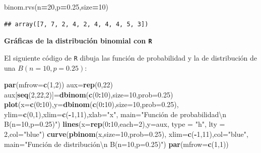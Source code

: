 \documentclass[]{book}
\newenvironment{Shaded}{\begin{snugshade}}{\end{snugshade}}
\newcommand{\CharTok}[1]{\textcolor[rgb]{0.31,0.60,0.02}{#1}}
\newcommand{\DataTypeTok}[1]{\textcolor[rgb]{0.13,0.29,0.53}{#1}}
\newcommand{\DecValTok}[1]{\textcolor[rgb]{0.00,0.00,0.81}{#1}}
\newcommand{\FloatTok}[1]{\textcolor[rgb]{0.00,0.00,0.81}{#1}}
\newcommand{\KeywordTok}[1]{\textcolor[rgb]{0.13,0.29,0.53}{\textbf{#1}}}
\newcommand{\NormalTok}[1]{#1}
\newcommand{\OperatorTok}[1]{\textcolor[rgb]{0.81,0.36,0.00}{\textbf{#1}}}
\newcommand{\StringTok}[1]{\textcolor[rgb]{0.31,0.60,0.02}{#1}}
\begin{document}
\begin{Shaded}
\begin{Highlighting}[]
\NormalTok{binom.rvs(n}\OperatorTok{=}\DecValTok{20}\NormalTok{,p}\OperatorTok{=}\FloatTok{0.25}\NormalTok{,size}\OperatorTok{=}\DecValTok{10}\NormalTok{)}
\end{Highlighting}
\end{Shaded}

\begin{verbatim}
## array([7, 7, 2, 4, 2, 4, 4, 4, 5, 3])
\end{verbatim}

\textbf{Gráficas de la distribución binomial con \texttt{R}}

El siguiente código de \texttt{R} dibuja las función de probabilidad y la de distribución de una \(B(n=10,p=0.25)\):

\begin{Shaded}
\begin{Highlighting}[]
\KeywordTok{par}\NormalTok{(}\DataTypeTok{mfrow=}\KeywordTok{c}\NormalTok{(}\DecValTok{1}\NormalTok{,}\DecValTok{2}\NormalTok{))}
\NormalTok{aux=}\KeywordTok{rep}\NormalTok{(}\DecValTok{0}\NormalTok{,}\DecValTok{22}\NormalTok{)}
\NormalTok{aux[}\KeywordTok{seq}\NormalTok{(}\DecValTok{2}\NormalTok{,}\DecValTok{22}\NormalTok{,}\DecValTok{2}\NormalTok{)]=}\KeywordTok{dbinom}\NormalTok{(}\KeywordTok{c}\NormalTok{(}\DecValTok{0}\OperatorTok{:}\DecValTok{10}\NormalTok{),}\DataTypeTok{size=}\DecValTok{10}\NormalTok{,}\DataTypeTok{prob=}\FloatTok{0.25}\NormalTok{)}
\KeywordTok{plot}\NormalTok{(}\DataTypeTok{x=}\KeywordTok{c}\NormalTok{(}\DecValTok{0}\OperatorTok{:}\DecValTok{10}\NormalTok{),}\DataTypeTok{y=}\KeywordTok{dbinom}\NormalTok{(}\KeywordTok{c}\NormalTok{(}\DecValTok{0}\OperatorTok{:}\DecValTok{10}\NormalTok{),}\DataTypeTok{size=}\DecValTok{10}\NormalTok{,}\DataTypeTok{prob=}\FloatTok{0.25}\NormalTok{),}
  \DataTypeTok{ylim=}\KeywordTok{c}\NormalTok{(}\DecValTok{0}\NormalTok{,}\DecValTok{1}\NormalTok{),}\DataTypeTok{xlim=}\KeywordTok{c}\NormalTok{(}\OperatorTok{-}\DecValTok{1}\NormalTok{,}\DecValTok{11}\NormalTok{),}\DataTypeTok{xlab=}\StringTok{"x"}\NormalTok{,}
  \DataTypeTok{main=}\StringTok{"Función de probabilidad}\CharTok{\textbackslash{}n}\StringTok{ B(n=10,p=0.25)"}\NormalTok{)}
\KeywordTok{lines}\NormalTok{(}\DataTypeTok{x=}\KeywordTok{rep}\NormalTok{(}\DecValTok{0}\OperatorTok{:}\DecValTok{10}\NormalTok{,}\DataTypeTok{each=}\DecValTok{2}\NormalTok{),}\DataTypeTok{y=}\NormalTok{aux, }\DataTypeTok{type =} \StringTok{"h"}\NormalTok{, }\DataTypeTok{lty =} \DecValTok{2}\NormalTok{,}\DataTypeTok{col=}\StringTok{"blue"}\NormalTok{)}
\KeywordTok{curve}\NormalTok{(}\KeywordTok{pbinom}\NormalTok{(x,}\DataTypeTok{size=}\DecValTok{10}\NormalTok{,}\DataTypeTok{prob=}\FloatTok{0.25}\NormalTok{),}
  \DataTypeTok{xlim=}\KeywordTok{c}\NormalTok{(}\OperatorTok{-}\DecValTok{1}\NormalTok{,}\DecValTok{11}\NormalTok{),}\DataTypeTok{col=}\StringTok{"blue"}\NormalTok{,}
  \DataTypeTok{main=}\StringTok{"Función de distribución\textbackslash{}n B(n=10,p=0.25)"}\NormalTok{)}
\KeywordTok{par}\NormalTok{(}\DataTypeTok{mfrow=}\KeywordTok{c}\NormalTok{(}\DecValTok{1}\NormalTok{,}\DecValTok{1}\NormalTok{))}
\end{Highlighting}
\end{Shaded}
\end{document}
